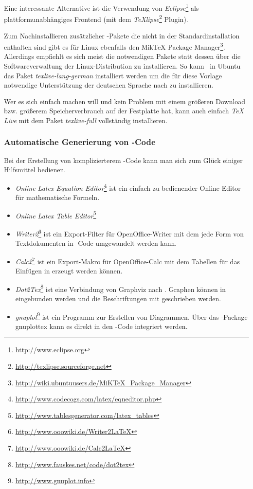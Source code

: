Eine interessante Alternative ist die Verwendung von
\emph{Eclipse}\footnote{\url{http://www.eclipse.org}} als plattformunabhängiges Frontend 
(mit dem \emph{TeXlipse}\footnote{\url{http://texlipse.sourceforge.net}}
Plugin).


Zum Nachinstallieren zusätzlicher \latex-Pakete die nicht in der
Standardinstallation enthalten sind gibt es für Linux ebenfalls den MikTeX
Package Manager\footnote{\url{http://wiki.ubuntuusers.de/MiKTeX_Package_Manager}}. Allerdings empfiehlt es sich meist die notwendigen Pakete statt dessen über die Softwareverwaltung der Linux-Distribution zu installieren. So kann \zB\ in Ubuntu das Paket \emph{texlive-lang-german} installiert werden um die für diese Vorlage notwendige Unterstützung der deutschen Sprache nach zu installieren.


Wer es sich einfach machen will und kein Problem mit einem größeren Download bzw. größerem Speicherverbrauch auf der Festplatte hat, kann auch einfach \emph{TeX Live} mit dem Paket \emph{texlive-full} vollständig installieren.

\subsubsection{Automatische Generierung von \latex-Code}
Bei der Erstellung von komplizierterem \latex-Code kann man sich zum Glück
einiger Hilfsmittel bedienen.

\begin{itemize}
\item \emph{Online Latex Equation
Editor}\footnote{\url{http://www.codecogs.com/latex/eqneditor.php}} ist ein
einfach zu bedienender Online Editor für mathematische Formeln.
\item \emph{Online Latex Table Editor}\footnote{\url{http://www.tablesgenerator.com/latex_tables}}
\item \emph{Writer2\latex}\footnote{\url{http://www.ooowiki.de/Writer2LaTeX}}
ist ein Export-Filter für OpenOffice-Writer mit dem jede Form von Textdokumenten in
\latex-Code umgewandelt werden kann.
\item \emph{Calc2\latex}\footnote{\url{http://www.ooowiki.de/Calc2LaTeX}} ist
ein Export-Makro für OpenOffice-Calc mit dem Tabellen für das Einfügen in \latex
erzeugt werden können.
\item \emph{Dot2Tex}\footnote{\url{http://www.fauskes.net/code/dot2tex}} ist
eine Verbindung von Graphviz nach \latex. Graphen können in \latex eingebunden werden
und die Beschriftungen mit \latex geschrieben werden.
\item \emph{gnuplot}\footnote{\url{http://www.gnuplot.info}} ist ein Programm
zur Erstellen von Diagrammen. Über das \latex-Package gnuplottex kann es direkt in
den \latex-Code integriert werden.
\end{itemize}


